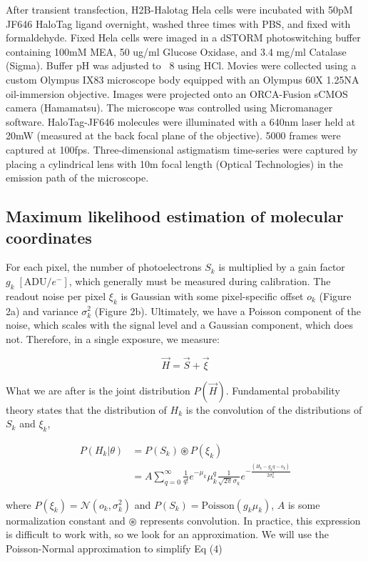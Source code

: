 \documentclass{ucetd}
\begin{document}
After transient transfection, H2B-Halotag Hela cells were incubated with 50pM JF646 HaloTag ligand overnight, washed three times with PBS, and fixed with formaldehyde. Fixed Hela cells were imaged in a dSTORM photoswitching buffer containing 100mM MEA, 50 ug/ml Glucose Oxidase, and 3.4 mg/ml Catalase (Sigma). Buffer pH was adjusted to ~8 using HCl. Movies were collected using a custom Olympus IX83 microscope body equipped with an Olympus 60X 1.25NA oil-immersion objective. Images were projected onto an ORCA-Fusion sCMOS camera (Hamamatsu). The microscope was controlled using Micromanager software. HaloTag-JF646 molecules were illuminated with a 640nm laser held at 20mW (measured at the back focal plane of the objective).  5000 frames were captured at 100fps. Three-dimensional astigmatism time-series were captured by placing a cylindrical lens with 10m focal length (Optical Technologies) in the emission path of the microscope.  

\subsection{Maximum likelihood estimation of molecular coordinates}

For each pixel, the number of photoelectrons $S_{k}$ is  multiplied by a gain factor $g_{k} \;[\mathrm{ADU}/e^{-}]$, which generally must be measured during calibration. The readout noise per pixel $\xi_{k}$ is Gaussian with some pixel-specific offset $o_{k}$ (Figure 2a) and variance $\sigma_{k}^{2}$ (Figure 2b). Ultimately, we have a Poisson component of the noise, which scales with the signal level and a Gaussian component, which does not. Therefore, in a single exposure, we measure: 

\begin{equation}
\vec{H} = \vec{S} + \vec{\xi}
\end{equation}

What we are after is the joint distribution $P(\vec{H})$. Fundamental probability theory states that the distribution of $H_{k}$ is the convolution of the distributions of $S_{k}$ and $\xi_{k}$,

\begin{align}
P(H_{k}|\theta) &= P(S_{k})\circledast P(\xi_{k})\\
&= A\sum_{q=0}^{\infty} \frac{1}{q!}e^{-\mu_{k}}\mu_{k}^{q}\frac{1}{\sqrt{2\pi}\sigma_{k}}e^{-\frac{(H_{k}-g_{k}q-o_{k})}{2\sigma_{k}^{2}}}
\end{align}

where $P(\xi_{k}) = \mathcal{N}(o_{k},\sigma_{k}^{2})$ and $P(S_{k}) = \mathrm{Poisson}(g_{k}\mu_{k})$,  $A$ is some normalization constant and $\circledast$ represents convolution. In practice, this expression is difficult to work with, so we look for an approximation. We will use the Poisson-Normal approximation to simplify Eq (4)
\end{document}
